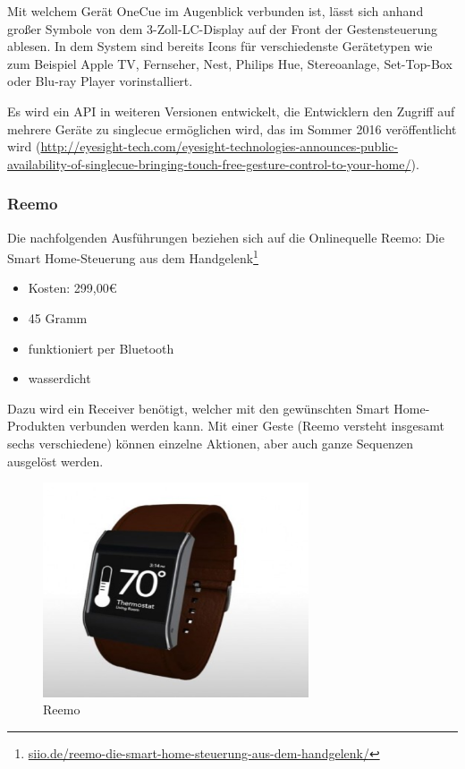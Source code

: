 Mit welchem Gerät OneCue im Augenblick verbunden ist, lässt sich anhand großer Symbole von dem 3-Zoll-LC-Display auf der Front der Gestensteuerung ablesen. In dem System sind bereits Icons für verschiedenste Gerätetypen wie zum Beispiel Apple TV, Fernseher, Nest, Philips Hue, Stereoanlage, Set-Top-Box oder Blu-ray Player vorinstalliert.

Es wird ein API in weiteren Versionen entwickelt, die Entwicklern den Zugriff auf mehrere Geräte zu singlecue ermöglichen wird, das im Sommer 2016 veröffentlicht wird (\url{http://eyesight-tech.com/eyesight-technologies-announces-public-availability-of-singlecue-bringing-touch-free-gesture-control-to-your-home/}).

\subsubsection{Reemo}

Die nachfolgenden Ausführungen beziehen sich auf die Onlinequelle \glqq Reemo: Die Smart Home-Steuerung aus dem Handgelenk\grqq\footnote{\url{siio.de/reemo-die-smart-home-steuerung-aus-dem-handgelenk/}}

\begin{itemize}
\item Kosten: 299,00€
\end{itemize}

\begin{itemize}
\item 45 Gramm
\item funktioniert per Bluetooth
\item wasserdicht
\end{itemize}

\noindent
Dazu wird ein Receiver benötigt, welcher mit den gewünschten Smart Home-Produkten verbunden werden kann. Mit einer Geste (Reemo versteht insgesamt sechs verschiedene) können einzelne Aktionen, aber auch ganze Sequenzen ausgelöst werden.

\begin{figure}[h!]
	\centering
	\includegraphics[width=0.7\textwidth]{img/Feedback-Mechanismen/Reemo.png}
	\caption{Reemo}
	\label{fig:feedbackReemo}
\end{figure}

